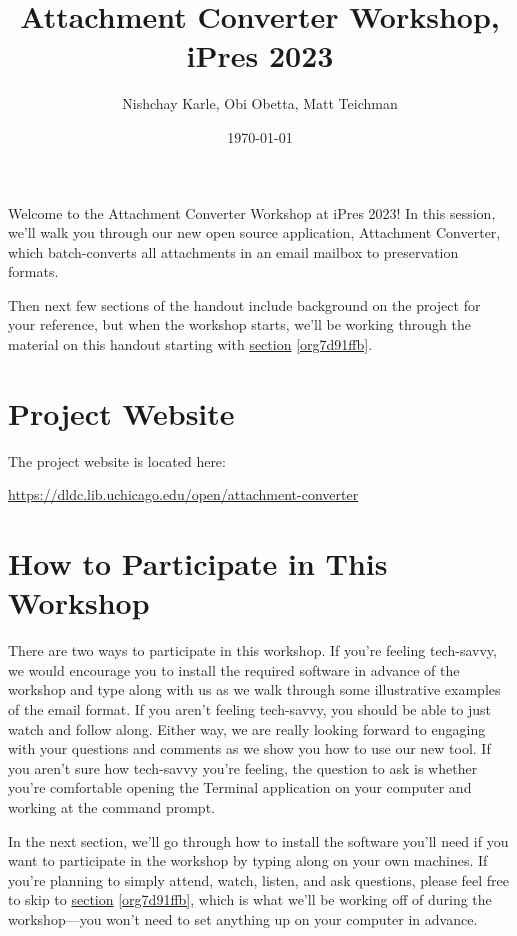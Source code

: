 \documentclass[11pt]{article}
\author{Nishchay Karle, Obi Obetta, Matt Teichman}
\date{\today}
\title{Attachment Converter Workshop, iPres 2023}
\begin{document}
\maketitle
Welcome to the Attachment Converter Workshop at iPres 2023!  In this
session, we'll walk you through our new open source application,
Attachment Converter, which batch-converts all attachments in an email
mailbox to preservation formats.

Then next few sections of the handout include background on the
project for your reference, but when the workshop starts, we'll be
working through the material on this handout starting with \hyperref[org7d91ffb]{section}
\ref{org7d91ffb}.

\section{Project Website}
\label{sec:orgca84666}

The project website is located here:

\url{https://dldc.lib.uchicago.edu/open/attachment-converter}


\section{How to Participate in This Workshop}
\label{sec:org531e7a3}

There are two ways to participate in this workshop.  If you're feeling
tech-savvy, we would encourage you to install the required software in
advance of the workshop and type along with us as we walk through some
illustrative examples of the email format.  If you aren't feeling
tech-savvy, you should be able to just watch and follow along.  Either
way, we are really looking forward to engaging with your questions and
comments as we show you how to use our new tool. If you aren't sure
how tech-savvy you're feeling, the question to ask is whether you're
comfortable opening the Terminal application on your computer and
working at the command prompt.

In the next section, we'll go through how to install the software
you'll need if you want to participate in the workshop by typing along
on your own machines.  If you're planning to simply attend, watch,
listen, and ask questions, please feel free to skip to \hyperref[org7d91ffb]{section}
\ref{org7d91ffb}, which is what we'll be working off of during the
workshop---you won't need to set anything up on your computer in
advance.
\end{document}
